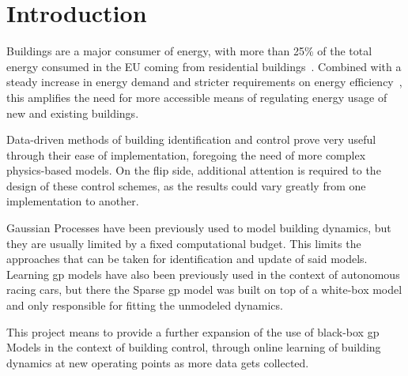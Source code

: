 \section{Introduction}

Buildings are a major consumer of energy, with more than 25\% of the total
energy consumed in the EU coming from residential
buildings~\cite{tsemekiditzeiranakiAnalysisEUResidential2019}. Combined with a
steady increase in energy demand and stricter requirements on energy
efficiency~\cite{europeancommission.jointresearchcentre.EnergyConsumptionEnergy2018},
this amplifies the need for more accessible means of regulating energy usage of
new and existing buildings.

Data-driven methods of building identification and control prove very useful
through their ease of implementation, foregoing the need of more complex
physics-based models. On the flip side, additional attention is required to the
design of these control schemes, as the results could vary greatly from one
implementation to another.

Gaussian Processes have been previously used to model building dynamics, but
they are usually limited by a fixed computational budget. This limits the
approaches that can be taken for identification and update of said models.
Learning \acrshort{gp} models have also been previously used in the context of
autonomous racing cars, but there the Sparse \acrshort{gp} model was built on
top of a white-box model and only responsible for fitting the unmodeled
dynamics. 

This project means to provide a further expansion of the use of black-box
\acrlong{gp} Models in the context of building control, through online learning
of building dynamics at new operating points as more data gets collected.
